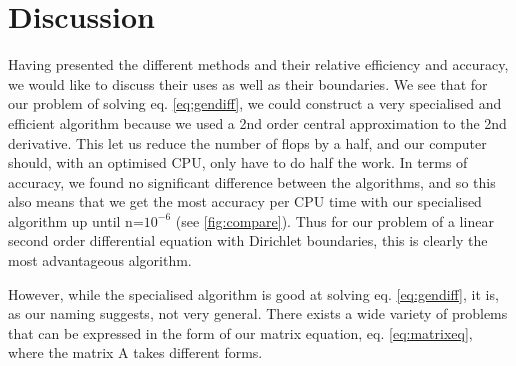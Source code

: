 \section{Discussion}
\label{sec:discussion}

Having presented the different methods and their relative efficiency and
accuracy, we would like to discuss their uses as well as their boundaries.
We see that for our problem of solving eq. \ref{eq;gendiff}, we could construct
a very specialised and efficient algorithm because we used a 2nd order
central approximation to the 2nd derivative. This let us reduce the number of
flops by a half, and our computer should, with an optimised CPU, only have to do
half the work. In terms of accuracy, we found no significant difference between
the algorithms, and so this also means that we get the most accuracy per CPU time
with our specialised algorithm up until n=$10^{-6}$ (see \ref{fig:compare}).
Thus for our problem of a linear second order differential equation with
Dirichlet boundaries, this is clearly the most advantageous algorithm.

However, while the specialised algorithm is good at solving eq. \ref{eq:gendiff},
it is, as our naming suggests, not very general. There exists a wide variety of
problems that can be expressed in the form of our matrix equation, eq.
\ref{eq:matrixeq}, where the matrix A takes different forms.
